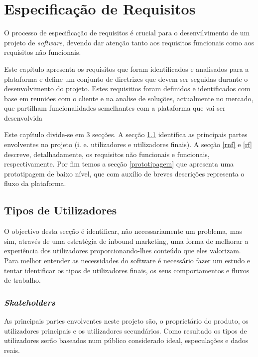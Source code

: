 \chapter{Especificação de Requisitos}
\label{sec:requisitos}

O processo de especificação de requisitos é crucial para o desenvilvimento de um projeto de \textit{software}, devendo dar atenção tanto aos requisitos funcionais como aos requisitos não funcionais.

Este capítulo apresenta os requisitos que foram identificados e analisados para a plataforma e define um conjunto de diretrizes que devem ser seguidas durante o desenvolvimento do projeto. Estes requisitios foram definidos e identificados com base em reuniões com o cliente e na analise de soluções, actualmente no mercado, que partilham funcionalidades semelhantes com a plataforma que vai ser desenvolvida

Este capítulo divide-se em 3 secções. A secção \ref{requisitos:tiposutilizadores} identifica as principais partes envolventes no projeto (i. e. utilizadores e utilizadores finais). A secção \ref{rnf} e \ref{rf} descreve, detalhadamente, os requisitos não funcionais e funcionais, respectivamente. Por fim temos a secção \ref{prototipagem} que apresenta uma prototipagem de baixo nível, que com auxílio de breves descrições representa o fluxo da plataforma.


\section{Tipos de Utilizadores}
\label{requisitos:tiposutilizadores}

O objectivo desta secção é identificar, não necessariamente um problema, mas sim, através de uma estratégia de inbound marketing, uma forma de melhorar a experiência dos utilizadores proporcionando-lhes conteúdo que eles valorizam. Para melhor entender as necessidades do software é necessário fazer um estudo e tentar identificar os tipos de utilizadores finais, os seus comportamentos e fluxos de trabalho.


\subsection{\textit{Skateholders}}

As principais partes envolventes neste projeto são, o proprietário do produto, os utilizadores principais e os utilizadores secundários. Como resultado os tipos de utilizadores serão baseados num público considerado  ideal, especulações e dados reais.


